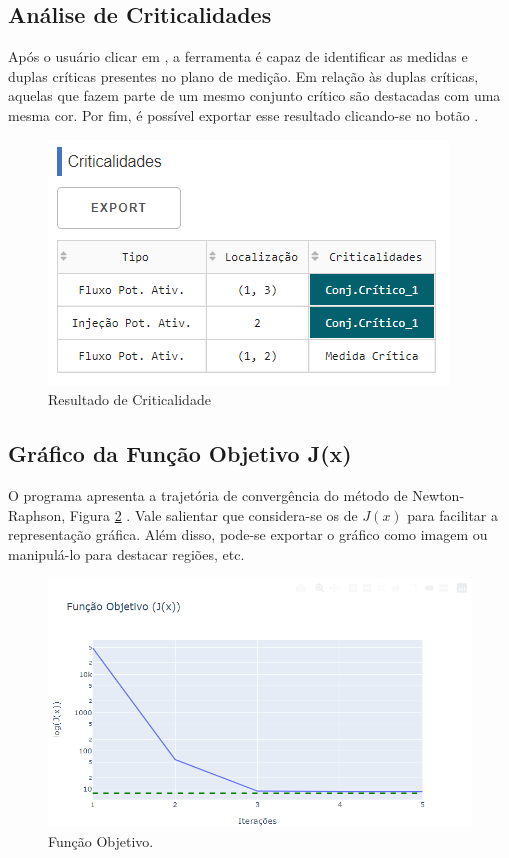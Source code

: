 \documentclass{article}
\begin{document}
\subsection{Análise de Criticalidades}
Após o usuário clicar em , a ferramenta é capaz de identificar as medidas e duplas críticas presentes no plano de medição. Em relação às duplas críticas, aquelas que fazem parte de um mesmo conjunto crítico são destacadas com uma mesma cor. Por fim, é possível exportar esse resultado clicando-se no botão .

\begin{figure}[H]
    \centering
    \includegraphics[scale = .65]{Imagens/Criticalidades_Ferrameta.PNG}
    \caption{Resultado de Criticalidade}
    \label{fig:my_label}
\end{figure}


\subsection{Gráfico da Função Objetivo J(x)}
O programa apresenta a trajetória de convergência do método de Newton-Raphson, Figura \ref{fig:fobj} . Vale salientar que considera-se os  de $J(x)$ para facilitar a representação gráfica. Além disso, pode-se exportar o gráfico como imagem ou manipulá-lo para destacar regiões, etc.

\begin{figure}[H]
    \centering
    \includegraphics[scale=.5]{Imagens/Função_Objetivo_Ferramenta.PNG}
    \caption{Função Objetivo.}
    \label{fig:fobj}
\end{figure}
\end{document}
